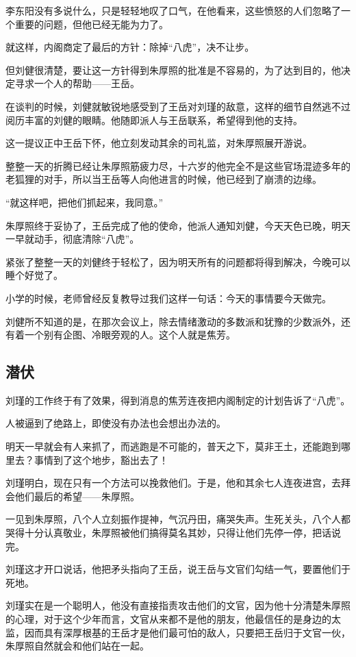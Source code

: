 \begin{multicols}{\theparacolNo}
		李东阳没有多说什么，只是轻轻地叹了口气，在他看来，这些愤怒的人们忽略了一个重要的问题，但他已经无能为力了。

		就这样，内阁商定了最后的方针：除掉“八虎”，决不让步。

		但刘健很清楚，要让这一方针得到朱厚照的批准是不容易的，为了达到目的，他决定寻求一个人的帮助——王岳。

		在谈判的时候，刘健就敏锐地感受到了王岳对刘瑾的敌意，这样的细节自然逃不过阅历丰富的刘健的眼睛。他随即派人与王岳联系，希望得到他的支持。

		这一提议正中王岳下怀，他立刻发动其余的司礼监，对朱厚照展开游说。

		整整一天的折腾已经让朱厚照筋疲力尽，十六岁的他完全不是这些官场混迹多年的老狐狸的对手，所以当王岳等人向他进言的时候，他已经到了崩溃的边缘。

		“就这样吧，把他们抓起来，我同意。”

		朱厚照终于妥协了，王岳完成了他的使命，他派人通知刘健，今天天色已晚，明天一早就动手，彻底清除“八虎”。

		紧张了整整一天的刘健终于轻松了，因为明天所有的问题都将得到解决，今晚可以睡个好觉了。

		小学的时候，老师曾经反复教导过我们这样一句话：今天的事情要今天做完。

		刘健所不知道的是，在那次会议上，除去情绪激动的多数派和犹豫的少数派外，还有着一个别有企图、冷眼旁观的人。这个人就是焦芳。

		\subsection{潜伏}
		刘瑾的工作终于有了效果，得到消息的焦芳连夜把内阁制定的计划告诉了“八虎”。

		人被逼到了绝路上，即使没有办法也会想出办法的。

		明天一早就会有人来抓了，而逃跑是不可能的，普天之下，莫非王土，还能跑到哪里去？事情到了这个地步，豁出去了！

		刘瑾明白，现在只有一个方法可以挽救他们。于是，他和其余七人连夜进宫，去拜会他们最后的希望——朱厚照。

		一见到朱厚照，八个人立刻振作提神，气沉丹田，痛哭失声。生死关头，八个人都哭得十分认真敬业，朱厚照被他们搞得莫名其妙，只得让他们先停一停，把话说完。

		刘瑾这才开口说话，他把矛头指向了王岳，说王岳与文官们勾结一气，要置他们于死地。

		刘瑾实在是一个聪明人，他没有直接指责攻击他们的文官，因为他十分清楚朱厚照的心理，对于这个少年而言，文官从来都不是他的朋友，他最信任的是身边的太监，因而具有深厚根基的王岳才是他们最可怕的敌人，只要把王岳归于文官一伙，朱厚照自然就会和他们站在一起。


\end{multicols}
